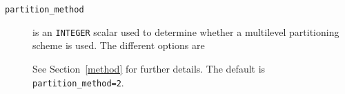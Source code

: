 \begin{description}
\item[\texttt{partition\_method}] is an {\tt INTEGER} scalar used to determine whether a multilevel 
partitioning scheme is used.  The different options are
See Section~\ref{method} for further details. The default is {\tt partition\_method=2}.



\end{description}
